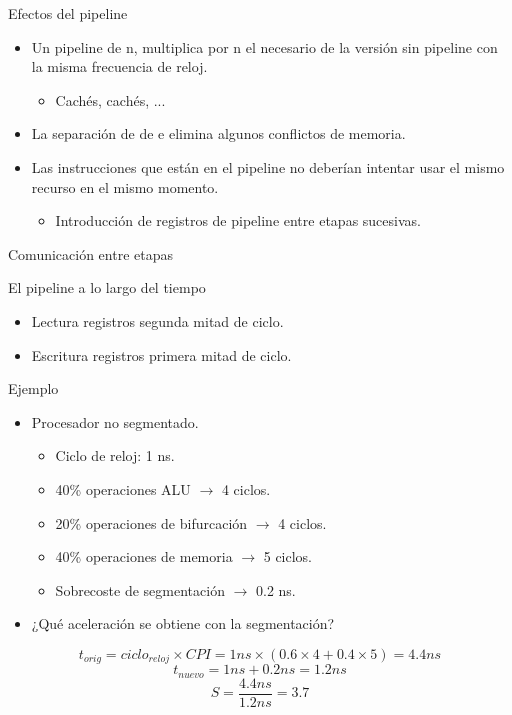 \begin{frame}[t]{Efectos del pipeline}
\begin{itemize}
  \item Un pipeline de  \alert{n}, 
  multiplica por \alert{n} el  
  necesario de la versión sin pipeline con la misma frecuencia de reloj.
    \begin{itemize}
      \item Cachés, cachés, ...
    \end{itemize}
  \item La separación de  de  e 
         elimina algunos \alert{conflictos} 
        de memoria.
  \item Las instrucciones que están en el pipeline \alert{no deberían}
        intentar usar el mismo recurso en el mismo momento.
    \begin{itemize}
      \item Introducción de registros de pipeline entre etapas sucesivas.
    \end{itemize}
\end{itemize}
\end{frame}

\begin{frame}[t,shrink=2]{Comunicación entre etapas}

\end{frame}

\begin{frame}[t]{El pipeline a lo largo del tiempo}

\begin{itemize}
  \item Lectura registros segunda mitad de ciclo.
  \item Escritura registros primera mitad de ciclo.
\end{itemize}
\end{frame}

\begin{frame}[t]{Ejemplo}
\begin{itemize}
  \item Procesador no segmentado.
    \begin{itemize}
      \item Ciclo de reloj: 1 ns.
      \item 40\% operaciones ALU $\rightarrow$ 4 ciclos.
      \item 20\% operaciones de bifurcación $\rightarrow$ 4 ciclos.
      \item 40\% operaciones de memoria $\rightarrow$ 5 ciclos.
      \item Sobrecoste de segmentación $\rightarrow$ 0.2 ns.
    \end{itemize}
  \item ¿Qué aceleración se obtiene con la segmentación?
\end{itemize}
\[
t_{orig} = ciclo_{reloj} \times CPI = 1 ns \times (0.6 \times 4 + 0.4 \times 5) = 4.4 ns
\]
\[
t_{nuevo} = 1 ns + 0.2 ns = 1.2 ns
\]
\[
S = \frac{4.4 ns}{1.2 ns} = 3.7
\]
\end{frame}
